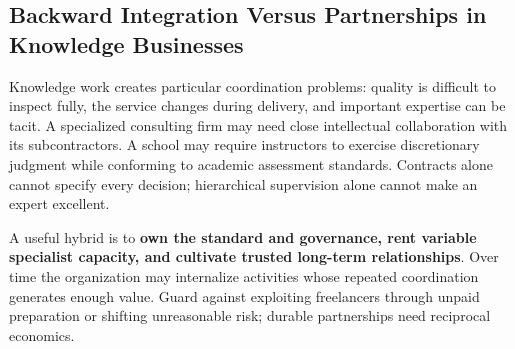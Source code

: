 \subsection{Backward Integration Versus Partnerships in Knowledge Businesses}
\label{sec:backward_integration_vs_partnerships_knowledge}

Knowledge work creates particular coordination problems: quality is difficult to inspect fully, the service changes during delivery, and important expertise can be tacit. A specialized consulting firm may need close intellectual collaboration with its subcontractors. A school may require instructors to exercise discretionary judgment while conforming to academic assessment standards. Contracts alone cannot specify every decision; hierarchical supervision alone cannot make an expert excellent.

A useful hybrid is to \textbf{own the standard and governance, rent variable specialist capacity, and cultivate trusted long-term relationships}. Over time the organization may internalize activities whose repeated coordination generates enough value. Guard against exploiting freelancers through unpaid preparation or shifting unreasonable risk; durable partnerships need reciprocal economics.
